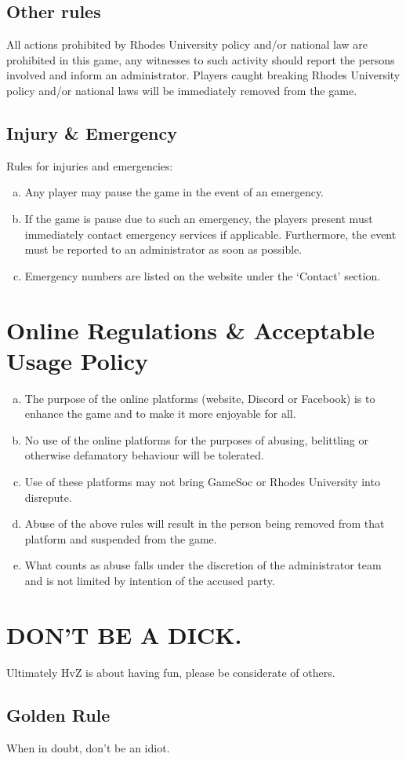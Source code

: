 \documentclass[a4paper,12pt]{article}
\begin{document}
\subsection{Other rules}
All actions prohibited by Rhodes University policy and/or national law are prohibited in this game, any witnesses to such activity should report the persons involved and inform an administrator. Players caught breaking Rhodes University policy and/or national laws will be immediately removed from the game. 

\subsection{Injury \& Emergency}

Rules for injuries and emergencies:
\begin{enumerate}[(a)]
    \item Any player may pause the game in the event of an emergency.
    \item If the game is pause due to such an emergency, the players present must immediately contact emergency services if applicable. Furthermore, the event must be reported to an administrator as soon as possible.
    \item Emergency numbers are listed on the website under the `Contact' section.
\end{enumerate}

\section{Online Regulations \& Acceptable Usage Policy}
\begin{enumerate}[(a)]
\item The purpose of the online platforms (website, Discord or Facebook) is to enhance the game and to make it more enjoyable for all. 
\item No use of the online platforms for the purposes of abusing, belittling or otherwise defamatory behaviour will be tolerated.
\item Use of these platforms may not bring GameSoc or Rhodes University into disrepute.
\item Abuse of the above rules will result in the person being removed from that platform and suspended from the game. 
\item What counts as abuse falls under the discretion of the administrator team and is not limited by intention of the accused party.
\end{enumerate}

\section{DON'T BE A DICK.}
\label{dbad}
Ultimately HvZ is about having fun, please be considerate of others.
\subsection{Golden Rule}
When in doubt, don't be an idiot.



\end{document}

